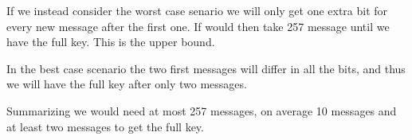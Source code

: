 \documentclass[a4paper,11pt]{article}
\begin{document}
	If we instead consider the worst case senario we will only get one extra bit for every
	new message after the first one. If would then take 257 message until we have the full
	key. This is the upper bound.

	In the best case scenario the two first messages will differ in all the bits, and thus
	we will have the full key after only two messages.

	Summarizing we would need at most 257 messages, on average 10 messages and at least two
	messages to get the full key.

		
\end{document}
